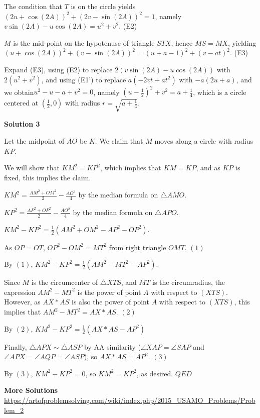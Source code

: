 \begin{enumerate}
 The condition that $T$ is on the circle yields $(2u+\cos(2A))^2+ (2v-\sin(2A))^2=1$, namely $v\sin(2A)-u\cos(2A)=u^2+v^2$.   (E2)

 $M$ is the mid-point on the hypotenuse of triangle $STX$, hence $MS=MX$, yielding $(u+\cos(2A))^2+(v-\sin(2A))^2=(u+a-1)^2+(v-at)^2$.   (E3)

 Expand (E3), using (E2) to replace $2(v\sin(2A)-u\cos(2A))$ with $2(u^2+v^2)$, and using (E1') to replace $a(-2vt+at^2)$ with $-a(2u+a)$, and we obtain$u^2-u-a+v^2=0$, namely $(u-\frac{1}{2})^2+v^2=a+\frac{1}{4}$, which is a circle centered at $(\frac{1}{2},0)$ with radius $r=\sqrt{a+\frac{1}{4}}$.

 



\textbf{Solution 3}

Let the midpoint of $AO$ be $K$. We claim that $M$ moves along a circle with radius $KP$.

 We will show that $KM^2 = KP^2$, which implies that $KM = KP$, and as $KP$ is fixed, this implies the claim.

 $KM^2 = \frac{AM^2+OM^2}{2}-\frac{AO^2}{4}$ by the median formula on $\triangle AMO$.

 $KP^2 = \frac{AP^2+OP^2}{2}-\frac{AO^2}{4}$ by the median formula on $\triangle APO$.

 $KM^2-KP^2 = \frac{1}{2}(AM^2+OM^2-AP^2-OP^2)$.

 As $OP = OT$, $OP^2-OM^2 = MT^2$ from right triangle $OMT$. $(1)$

 By $(1)$, $KM^2-KP^2 = \frac{1}{2}(AM^2-MT^2-AP^2)$.

 Since $M$ is the circumcenter of $\triangle XTS$, and $MT$ is the circumradius, the expression $AM^2-MT^2$ is the power of point $A$ with respect to $(XTS)$. However, as $AX*AS$ is also the power of point $A$ with respect to $(XTS)$, this implies that $AM^2-MT^2=AX*AS$. $(2)$

 By $(2)$, $KM^2-KP^2 = \frac{1}{2}(AX*AS-AP^2)$

 Finally, $\triangle APX \sim \triangle ASP$ by AA similarity ($\angle XAP = \angle SAP$ and $\angle APX = \angle AQP = \angle ASP$), so $AX*AS = AP^2$. $(3)$

 By $(3)$, $KM^2-KP^2=0$, so $KM^2=KP^2$, as desired. $QED$

 \textbf{More Solutions} \href{https://artofproblemsolving.com/wiki/index.php/2015\_USAMO\_Problems/Problem\_2}{https://artofproblemsolving.com/wiki/index.php/2015\_USAMO\_Problems/Problem\_2}


\end{enumerate}
